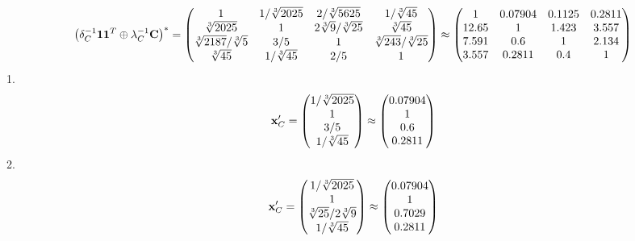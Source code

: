 \documentclass[10pt,a4paper]{article}
\begin{document}
	\[
		\left(\delta_{C}^{-1}\bold{11}^T \oplus \lambda_{C}^{-1}\bold{C}\right)^* = 
		\begin{pmatrix}
			{1}{} & {1} / {\sqrt[3]{2025}} & {{2}} / {\sqrt[3]{5625}} & {1} / {\sqrt[3]{45}} \\
			{\sqrt[3]{2025}}{} & {1}{} & {{2}\sqrt[3]{9}} / {\sqrt[3]{25}} & {\sqrt[3]{45}}{} \\
			{\sqrt[3]{2187}} / {\sqrt[3]{5}} & {{3}} / {{5}} & {1}{} & {\sqrt[3]{243}} / {\sqrt[3]{25}} \\
			{\sqrt[3]{45}}{} & {1} / {\sqrt[3]{45}} & {{2}} / {{5}} & {1}{} \\
		\end{pmatrix}
		\approx
		\begin{pmatrix}
			1        & 0.07904  & 0.1125   & 0.2811   \\
			12.65    & 1        & 1.423    & 3.557    \\
			7.591    & 0.6      & 1        & 2.134    \\
			3.557    & 0.2811   & 0.4      & 1        \\
		\end{pmatrix}
	\]
	1.
	\[
		\bold{x}'_{C} = 
		\begin{pmatrix}
			{1} / {\sqrt[3]{2025}} \\
			{1}{} \\
			{{3}} / {{5}} \\
			{1} / {\sqrt[3]{45}} \\
		\end{pmatrix}
		\approx
		\begin{pmatrix}
			0.07904  \\
			1        \\
			0.6      \\
			0.2811   \\
		\end{pmatrix}
	\]
	2.
	\[
		\bold{x}'_{C} = 
		\begin{pmatrix}
			{1} / {\sqrt[3]{2025}} \\
			{1}{} \\
			{\sqrt[3]{25}} / {{2}\sqrt[3]{9}} \\
			{1} / {\sqrt[3]{45}} \\
		\end{pmatrix}
		\approx
		\begin{pmatrix}
			0.07904  \\
			1        \\
			0.7029   \\
			0.2811   \\
		\end{pmatrix}
	\]
\end{document}
